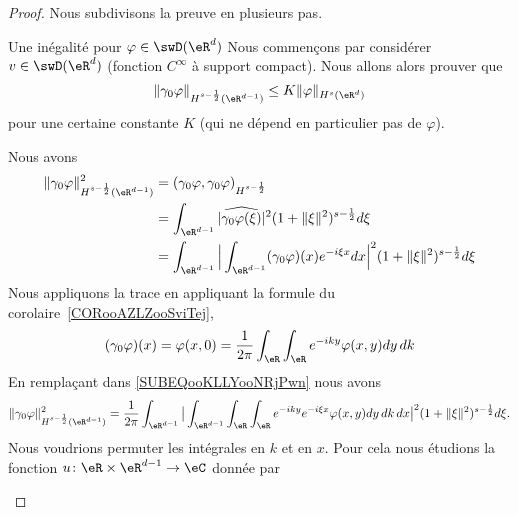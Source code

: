 \begin{proof}
	Nous subdivisons la preuve en plusieurs pas.
	\begin{subproof}
		\item[Une inégalité pour \( \varphi\in\swD(\eR^d)\)]
		Nous commençons par considérer \( v\in \swD(\eR^d)\) (fonction \(  C^{\infty}\) à support compact). Nous allons alors prouver que
		\begin{equation}
			\| \gamma_0\varphi \|_{H^{s-\frac{ 1 }{2}}(\eR^{d-1})}\leq K\| \varphi \|_{H^s(\eR^d)}
		\end{equation}
		pour une certaine constante \( K\) (qui ne dépend en particulier pas de \( \varphi\)).

		Nous avons
		\begin{subequations}
			\begin{align}
				\| \gamma_0\varphi \|^2_{H^{s-\frac{ 1 }{2}}(\eR^{d-1})} & =(  \gamma_0\varphi,\gamma_0\varphi  )_{H^{s-\frac{ 1 }{2}}}                                                                                       \\
				                                                         & =\int_{\eR^{d-1}}| \widehat{\gamma_0\varphi(\xi)} |^2(1+\| \xi \|^2)^{s-\frac{ 1 }{2}}d\xi                                                         \\
				                                                         & =\int_{\eR^{d-1}}\Big| \int_{\eR^{d-1}}(\gamma_0\varphi)(x) e^{-i\xi x}dx \Big|^2(1+\| \xi \|^2)^{s-\frac{ 1 }{2}}d\xi \label{SUBEQooKLLYooNRjPwn} \\
			\end{align}
		\end{subequations}
		Nous appliquons la trace en appliquant la formule du corolaire~\ref{CORooAZLZooSviTej},
		\begin{equation}
			(\gamma_0\varphi)(x)= \varphi(x,0) =\frac{1}{ 2\pi }\int_{\eR}\int_{\eR} e^{-iky}\varphi(x,y)dy\,dk
		\end{equation}
		En remplaçant dans \eqref{SUBEQooKLLYooNRjPwn} nous avons
		\begin{equation}
			\| \gamma_0\varphi \|^2_{H^{s-\frac{ 1 }{2}}(\eR^{d-1})}=\frac{1}{ 2\pi }\int_{\eR^{d-1}}\big| \int_{\eR^{d-1}}\int_{\eR}\int_{\eR} e^{-iky} e^{-i\xi x}\varphi(x,y)dy\,dk\,dx \big|^2(1+\| \xi \|^2)^{s-\frac{ 1 }{2}}d\xi.
		\end{equation}
		Nous voudrions permuter les intégrales en \( k\) et en \( x\). Pour cela nous étudions la fonction \( u\colon \eR\times \eR^{d-1}\to \eC\) donnée par
		\begin{equation}

\end{equation}
\end{subproof}
\end{proof}

